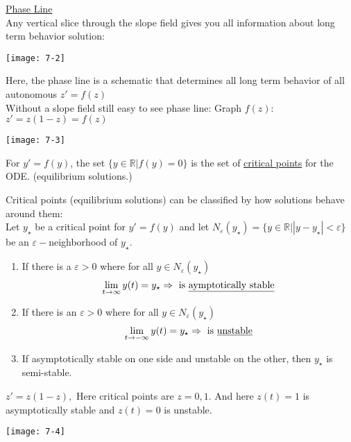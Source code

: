 {\large \underline{Phase Line}}\\
Any vertical slice through the slope field gives you all information about long term behavior solution:
\begin{center}
	\texttt{[image: 7-2]}
\end{center}
Here, the phase line is a schematic that determines all long term behavior of all autonomous $z'=f(z)$\\
Without a slope field still easy to see phase line: Graph $f(z)$: $z' = z(1-z) = f(z)$
\begin{center}
	\texttt{[image: 7-3]}
\end{center}
\begin{definition-N}
	For $y' = f(y)$, the set $\{ y \in \mathbb{R} \big| f(y) = 0\}$ is the set of \underline{critical points} for the ODE. (equilibrium solutions.)
\end{definition-N}
Critical points (equilibrium solutions) can be classified by how solutions behave around them:\\
Let $y_{\star}$ be a critical point for $y'=f(y)$ and let $N_{\varepsilon}(y_{\star}) = \{y \in  \mathbb{R} \big| |y - y_{\star} | < \varepsilon\}$ be an $\varepsilon-$neighborhood of $y_{\star}$.
\begin{enumerate}[label=\protect\circled{\alph*}]
	\item If there is a $\varepsilon > 0$ where for all $y \in N_{\varepsilon}(y_{\star})$
	\begin{equation*}
		\lim_{t \to \infty} y(t) = y_{\star} \Rightarrow \text{ is \underline{aymptotically stable}}
	\end{equation*}
	\item If there is an $\varepsilon > 0$ where for all $y \in N_{\varepsilon}(y_{\star})$
	\begin{equation*}
		\lim_{t \to -\infty} y(t) = y_{\star} \Rightarrow \text{ is \underline{unstable}}
	\end{equation*}
	\item If asymptotically stable on one side and unstable on the other, then $y_{\star}$ is semi-stable.
\end{enumerate}
\begin{example-N}
	$z' = z(1-z),$ Here critical points are $z = 0, 1$. And here $z(t) = 1$ is asymptotically stable and $z(t) = 0$ is unstable.
	\begin{center}
		\texttt{[image: 7-4]}
	\end{center}
\end{example-N}
